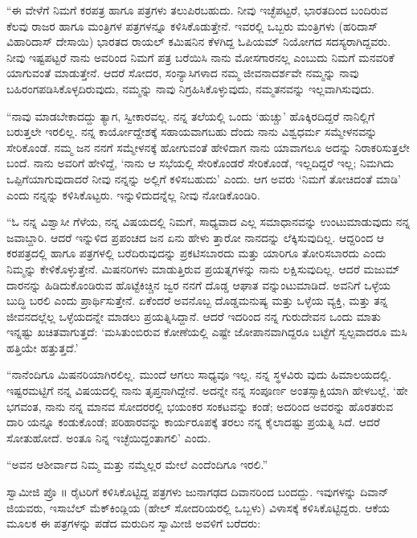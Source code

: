 “ಈ ವೇಳೆಗೆ ನಿಮಗೆ ಕರಪತ್ರ ಹಾಗೂ ಪತ್ರಗಳು ತಲುಪಿರಬಹುದು. ನೀವು ಇಚ್ಛೆಪಟ್ಟರೆ, ಭಾರತದಿಂದ ಬಂದಿರುವ ಕೆಲವು ರಾಜರ ಹಾಗೂ ಮಂತ್ರಿಗಳ ಪತ್ರಗಳನ್ನೂ ಕಳಿಸಿಕೊಡುತ್ತೇನೆ. ಇವರಲ್ಲಿ ಒಬ್ಬರು ಮಂತ್ರಿಗಳು (ಹರಿದಾಸ್ ವಿಹಾರಿದಾಸ್ ದೇಸಾಯಿ) ಭಾರತದ ರಾಯಲ್ ಕಮಿಷನಿನ ಕೆಳಗಿದ್ದ ಓಪಿಯಮ್ ನಿಯೋಗದ ಸದಸ್ಯರಾಗಿದ್ದವರು. ನೀವು ಇಷ್ಟಪಟ್ಟರೆ ನಾನು ಅವರಿಂದ ನಿಮಗೆ ಪತ್ರ ಬರೆಯಿಸಿ ನಾನು ಮೋಸಗಾರನಲ್ಲ ಎಂಬುದು ನಿಮಗೆ ಮನವರಿಕೆ ಯಾಗುವಂತೆ ಮಾಡುತ್ತೇನೆ. ಆದರೆ ಸೋದರ, ಸಂನ್ಯಾಸಿಗಳಾದ ನಮ್ಮ ಜೀವನಾದರ್ಶವೇ ನಮ್ಮನ್ನು ನಾವು ಬಹಿರಂಗಪಡಿಸಿಕೊಳ್ಳದಿರುವುದು, ನಮ್ಮನ್ನು ನಾವು ನಿಗ್ರಹಿಸಿಕೊಳ್ಳುವುದು, ನಮ್ಮತನವನ್ನು ಇಲ್ಲವಾಗಿಸುವುದು.

“ನಾವು ಮಾಡಬೇಕಾದದ್ದು ತ್ಯಾಗ, ಸ್ವೀಕಾರವಲ್ಲ. ನನ್ನ ತಲೆಯಲ್ಲಿ ಒಂದು ‘ಹುಚ್ಚು’ ಹೊಕ್ಕಿರದಿದ್ದರೆ ನಾನಿಲ್ಲಿಗೆ ಬರುತ್ತಲೇ ಇರಲಿಲ್ಲ. ನನ್ನ ಕಾರ್ಯೋದ್ದೇಶಕ್ಕೆ ಸಹಾಯವಾಗಬಹು ದೆಂದು ನಾನು ವಿಶ್ವಧರ್ಮ ಸಮ್ಮೇಳನವನ್ನು ಸೇರಿಕೊಂಡೆ. ನಮ್ಮ ಜನ ನನಗೆ ಸಮ್ಮೇಳನಕ್ಕೆ ಹೋಗುವಂತೆ ಹೇಳಿದಾಗ ನಾನು ಯಾವಾಗಲೂ ಅದನ್ನು ನಿರಾಕರಿಸುತ್ತಲೇ ಬಂದೆ. ನಾನು ಅವರಿಗೆ ಹೇಳಿದ್ದೆ, ‘ನಾನು ಆ ಸಭೆಯಲ್ಲಿ ಸೇರಿಕೊಂಡರೆ ಸೇರಿಕೊಂಡೆ, ಇಲ್ಲದಿದ್ದರೆ ಇಲ್ಲ; ನಿಮಗಿದು ಒಪ್ಪಿಗೆಯಾಗುವುದಾದರೆ ನೀವು ನನ್ನನ್ನು ಅಲ್ಲಿಗೆ ಕಳಿಸಬಹುದು’ ಎಂದು. ಆಗ ಅವರು ‘ನಿಮಗೆ ತೋಚಿದಂತೆ ಮಾಡಿ’ ಎಂದು ನನ್ನನ್ನು ಕಳಿಸಿಕೊಟ್ಟರು. ಇನ್ನುಳಿದುದನ್ನೆಲ್ಲ ನೀವು ನೋಡಿಕೊಂಡಿರಿ.

“ಓ ನನ್ನ ವಿಶ್ವಾಸೀ ಗೆಳೆಯ, ನನ್ನ ವಿಷಯದಲ್ಲಿ ನಿಮಗೆ, ಸಾಧ್ಯವಾದ ಎಲ್ಲ ಸಮಾಧಾನವನ್ನು ಉಂಟುಮಾಡುವುದು ನನ್ನ ಜವಾಬ್ದಾರಿ. ಆದರೆ ಇನ್ನುಳಿದ ಪ್ರಪಂಚದ ಜನ ಏನು ಹೇಳು ತ್ತಾರೋ ನಾನದನ್ನು ಲೆಕ್ಕಿಸುವುದಿಲ್ಲ. ಆದ್ದರಿಂದ ಆ ಕರಪತ್ರದಲ್ಲಿ ಹಾಗೂ ಪತ್ರಗಳಲ್ಲಿ ಬರೆದಿರುವುದನ್ನು ಪ್ರಕಟಿಸಬಾರದು ಮತ್ತು ಯಾರಿಗೂ ತೋರಿಸಬಾರದು ಎಂದು ನಿಮ್ಮನ್ನು ಕೇಳಿಕೊಳ್ಳುತ್ತೇನೆ. ಮಿಷನರಿಗಳು ಮಾಡುತ್ತಿರುವ ಪ್ರಯತ್ನಗಳನ್ನು ನಾನು ಲಕ್ಷಿಸುವುದಿಲ್ಲ. ಆದರೆ ಮಜುಮ್​ದಾರನನ್ನು ಹಿಡಿದುಕೊಂಡಿರುವ ಹೊಟ್ಟೆಕಿಚ್ಚಿನ ಜ್ವರ ನನಗೆ ದೊಡ್ಡ ಆಘಾತ ವನ್ನುಂಟುಮಾಡಿದೆ. ಅವನಿಗೆ ಒಳ್ಳೆಯ ಬುದ್ಧಿ ಬರಲಿ ಎಂದು ಪ್ರಾರ್ಥಿಸುತ್ತೇನೆ. ಏಕೆಂದರೆ ಅವನೊಬ್ಬ ದೊಡ್ಡಮನುಷ್ಯ ಮತ್ತು ಒಳ್ಳೆಯ ವ್ಯಕ್ತಿ, ಮತ್ತು ತನ್ನ ಜೀವನದಲ್ಲೆಲ್ಲ ಒಳ್ಳೆಯದನ್ನೇ ಮಾಡಲು ಪ್ರಯತ್ನಿಸಿದ್ದಾನೆ. ಆದರೆ ಇದರಿಂದ ನನ್ನ ಗುರುದೇವನ ಒಂದು ಮಾತು ಇನ್ನಷ್ಟು ಖಚಿತವಾಗುತ್ತದೆ: ‘ಮಸಿತುಂಬಿರುವ ಕೋಣೆಯಲ್ಲಿ ಎಷ್ಟೇ ಜೋಪಾನವಾಗಿದ್ದರೂ ಬಟ್ಟೆಗೆ ಸ್ವಲ್ಪವಾದರೂ ಮಸಿ ಹತ್ತಿಯೇ ಹತ್ತುತ್ತದೆ.’

“ನಾನೆಂದಿಗೂ ಮಿಷನರಿಯಾಗಿರಲಿಲ್ಲ. ಮುಂದೆ ಆಗಲು ಸಾಧ್ಯವೂ ಇಲ್ಲ. ನನ್ನ ಸ್ಥಳವಿರು ವುದು ಹಿಮಾಲಯದಲ್ಲಿ. ಇಷ್ಟರಮಟ್ಟಿಗೆ ನನ್ನ ವಿಷಯದಲ್ಲಿ ನಾನು ತೃಪ್ತನಾಗಿದ್ದೇನೆ. ಅದನ್ನೇ ನನ್ನ ಸಂಪೂರ್ಣ ಅಂತಸ್ಸಾಕ್ಷಿಯಾಗಿ ಹೇಳಬಲ್ಲೆ, ‘ಹೇ ಭಗವಂತ, ನಾನು ನನ್ನ ಮಾನವ ಸೋದರರಲ್ಲಿ ಭಯಂಕರ ಸಂಕಟವನ್ನು ಕಂಡೆ; ಅದರಿಂದ ಅವರನ್ನು ಹೊರತರುವ ದಾರಿ ಯನ್ನೂ ಕಂಡುಕೊಂಡೆ; ಪರಿಹಾರವನ್ನು ಕಾರ್ಯರೂಪಕ್ಕೆ ತರಲು ನನ್ನ ಕೈಲಾದಷ್ಟು ಪ್ರಯತ್ನಿ ಸಿದೆ. ಆದರೆ ಸೋತುಹೋದೆ. ಅಂತೂ ನಿನ್ನ ಇಚ್ಛೆಯಿದ್ದಂತಾಗಲಿ’ ಎಂದು.

“ಅವನ ಆಶೀರ್ವಾದ ನಿಮ್ಮ ಮತ್ತು ನಮ್ಮೆಲ್ಲರ ಮೇಲೆ ಎಂದೆಂದಿಗೂ ಇರಲಿ.”

ಸ್ವಾಮೀಜಿ ಪ್ರೊ ॥ ರೈಟರಿಗೆ ಕಳಿಸಿಕೊಟ್ಟಿದ್ದ ಪತ್ರಗಳು ಜುನಾಗಢದ ದಿವಾನರಿಂದ ಬಂದದ್ದು. ಇವುಗಳನ್ನು ದಿವಾನ್​ಜಿಯವರು, ಇಸಾಬೆಲ್ ಮೆಕ್​ಕಿಂಡ್ಲಿಯ (ಹೇಲ್ ಸೋದರಿಯರಲ್ಲಿ ಒಬ್ಬಳು) ವಿಳಾಸಕ್ಕೆ ಕಳಿಸಿಕೊಟ್ಟಿದ್ದರು. ಆಕೆಯ ಮೂಲಕ ಈ ಪತ್ರಗಳನ್ನು ಪಡೆದ ಮರುದಿನ ಸ್ವಾಮೀಜಿ ಅವಳಿಗೆ ಬರೆದರು:

